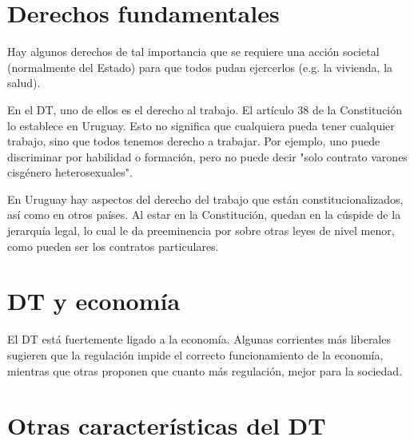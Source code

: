 \documentclass[../main.tex]{subfiles}
\begin{document}
\section{Derechos fundamentales}

Hay algunos derechos de tal importancia que se requiere una acción societal (normalmente del Estado) para que todos pudan ejercerlos (e.g. la vivienda, la salud).

En el DT, uno de ellos es el derecho al trabajo.
El artículo 38 de la Constitución lo establece en Uruguay.
Esto no significa que cualquiera pueda tener cualquier trabajo, sino que todos tenemos derecho a trabajar.
Por ejemplo, uno puede discriminar por habilidad o formación, pero no puede decir "solo contrato varones cisgénero heterosexuales".

En Uruguay hay aspectos del derecho del trabajo que están constitucionalizados, así como en otros países.
Al estar en la Constitución, quedan en la cúspide de la jerarquía legal, lo cual le da preeminencia por sobre otras leyes de nivel menor, como pueden ser los contratos particulares.

\section{DT y economía}

El DT está fuertemente ligado a la economía.
Algunas corrientes más liberales sugieren que la regulación impide el correcto funcionamiento de la economía, mientras que otras proponen que cuanto más regulación, mejor para la sociedad.

\section{Otras características del DT}
\end{document}
